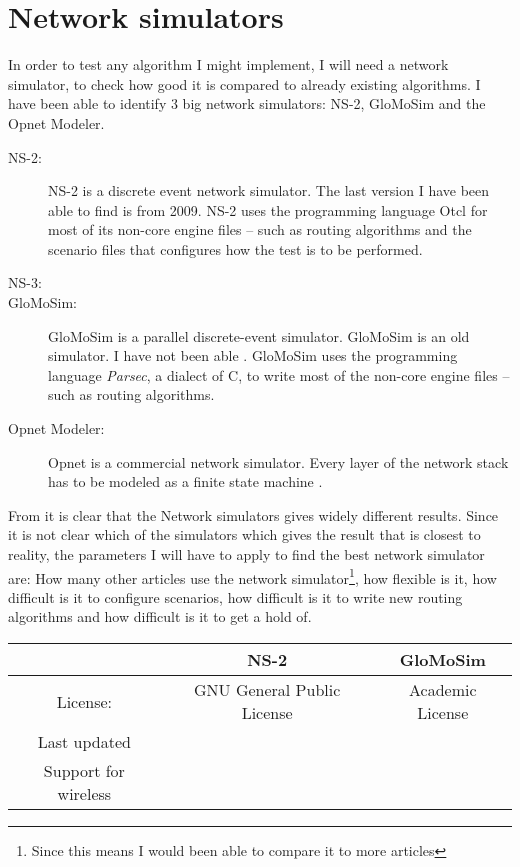 \section{Network simulators}

In order to test any algorithm I might implement, I will need a network simulator, to check how good it is compared to already existing algorithms. I have been able to identify 3 big network simulators: NS-2, GloMoSim and the Opnet Modeler.

\begin{description}
\item[NS-2:] NS-2 is a discrete event network simulator. The last version I have been able to find is from 2009. NS-2 uses the programming language Otcl for most of its non-core engine files -- such as routing algorithms and the scenario files that configures how the test is to be performed.
\item[NS-3:]
\item[GloMoSim:] GloMoSim is a parallel discrete-event simulator. GloMoSim is an old simulator. I have not been able   . GloMoSim uses the programming language \emph{Parsec}, a dialect of C, to write most of the non-core engine files -- such as routing algorithms. 
\item[Opnet Modeler:] Opnet is a commercial network simulator. Every layer of the network stack has to be modeled as a finite state machine \cite{MANcom}.
\end{description}

From \cite{MANcom}  it is clear that the Network simulators gives widely different results. Since it is not clear which of the simulators which gives the result that is closest to reality, the parameters I will have to apply to find the best network simulator are: How many other articles use the network simulator\footnote{Since this means I would been able to compare it to more articles}, how flexible is it, how difficult is it to configure scenarios, how difficult is it to write new routing algorithms and how difficult is it to get a hold of.

\begin{tabular}[3]{c|c|c}
 & NS-2 & GloMoSim \\
\hline
License: & GNU General Public License & Academic License \\
\hline
Last updated & & \\
Support for wireless & & \\

\end{tabular}

